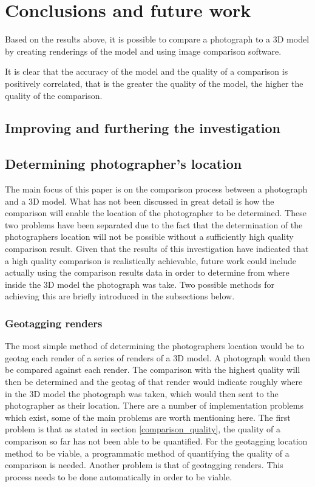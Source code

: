 \documentclass[11pt,a4paper]{report}
\begin{document}
\chapter{Conclusions and future work}
	Based on the results above, it is possible to compare a photograph to a 3D model by creating renderings of the model and using image comparison software.
	
	It is clear that the accuracy of the model and the quality of a comparison is positively correlated, that is the greater the quality of the model, the higher the quality of the comparison.
	
	\section{Improving and furthering the investigation}
		
		
	\section{Determining photographer's location}
		The main focus of this paper is on the comparison process between a photograph and a 3D model. What has not been discussed in great detail is how the comparison will enable the location of the photographer to be determined. These two problems have been separated due to the fact that the determination of the photographers location will not be possible without a sufficiently high quality comparison result. Given that the results of this investigation have indicated that a high quality comparison is realistically achievable, future work could include actually using the comparison results data in order to determine from where inside the 3D model the photograph was take. Two possible methods for achieving this are briefly introduced in the subsections below.
		\subsection{Geotagging renders}
			The most simple method of determining the photographers location would be to geotag each render of a series of renders of a 3D model. A photograph would then be compared against each render. The comparison with the highest quality will then be determined and the geotag of that render would indicate roughly where in the 3D model the photograph was taken, which would then sent to the photographer as their location.
			There are a number of implementation problems which exist, some of the main problems are worth mentioning here.
			The first problem is that as stated in section \ref{comparison_quality}, the quality of a comparison so far has not been able to be quantified. For the geotagging location method to be viable, a programmatic method of quantifying the quality of a comparison is needed.
			Another problem is that of geotagging renders. This process needs to be done automatically in order to be viable.
\end{document}

